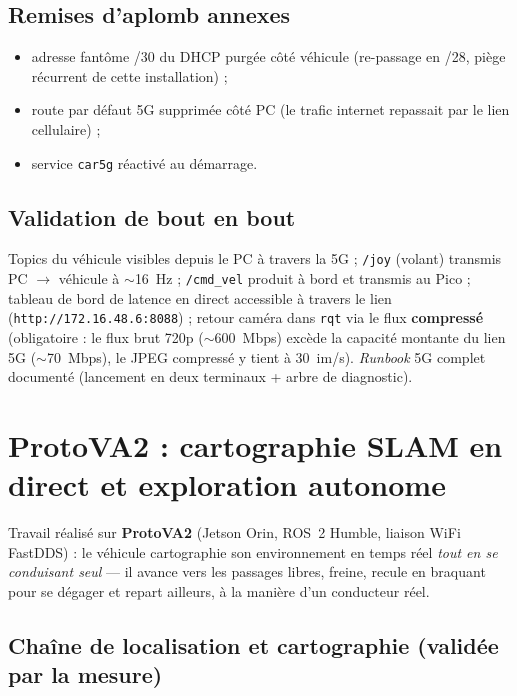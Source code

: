 \documentclass[11pt,a4paper]{article}
\begin{document}
\subsection{Remises d'aplomb annexes}
\begin{itemize}[itemsep=2pt]
  \item adresse fantôme /30 du DHCP purgée côté véhicule (re-passage en /28,
        piège récurrent de cette installation) ;
  \item route par défaut 5G supprimée côté PC (le trafic internet repassait
        par le lien cellulaire) ;
  \item service \texttt{car5g} réactivé au démarrage.
\end{itemize}

\subsection{Validation de bout en bout}
Topics du véhicule visibles depuis le PC à travers la 5G ; \texttt{/joy}
(volant) transmis PC $\rightarrow$ véhicule à $\sim$16~Hz ; \texttt{/cmd\_vel}
produit à bord et transmis au Pico ; tableau de bord de latence en direct
accessible à travers le lien (\texttt{http://172.16.48.6:8088}) ; retour
caméra dans \texttt{rqt} via le flux \textbf{compressé} (obligatoire : le flux
brut 720p ($\sim$600~Mbps) excède la capacité montante du lien 5G
($\sim$70~Mbps), le JPEG compressé y tient à 30~im/s). \emph{Runbook} 5G
complet documenté (lancement en deux terminaux + arbre de diagnostic).

\section{ProtoVA2 : cartographie SLAM en direct et exploration autonome}

Travail réalisé sur \textbf{ProtoVA2} (Jetson Orin, ROS~2 Humble, liaison WiFi
FastDDS) : le véhicule cartographie son environnement en temps réel
\emph{tout en se conduisant seul} — il avance vers les passages libres, freine,
recule en braquant pour se dégager et repart ailleurs, à la manière d'un
conducteur réel.

\subsection{Chaîne de localisation et cartographie (validée par la mesure)}
\end{document}
